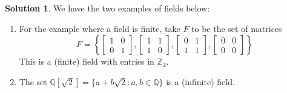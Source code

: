 \documentclass[11pt]{amsart}
\theoremstyle{}\newtheorem{question}{Question}
\theoremstyle{definition}\newtheorem*{solution}{Solution}
\newcommand{\Q}{\mathbb{Q}}
\newcommand{\Z}{\mathbb{Z}}
\begin{document}
\begin{solution}
    We have the two examples of fields below:
    \begin{enumerate}
        \item For the example where a field is finite, take $F$ to be the set of matrices
        \begin{equation*}
            F = \left\{\begin{bmatrix} 1 & 0 \\ 0 & 1 \end{bmatrix}, \begin{bmatrix} 1 & 1 \\ 1 & 0 \end{bmatrix}, \begin{bmatrix} 0 & 1 \\ 1 & 1 \end{bmatrix}, \begin{bmatrix} 0 & 0 \\ 0 & 0 \end{bmatrix}\right\}
        \end{equation*}
        This is a (finite) field with entries in $\Z_2$.

        \item The set $\Q[\sqrt{2}] = \{a + b\sqrt{2} : a, b \in \Q\}$ is a (infinite) field.
    \end{enumerate}
\end{solution}
\end{document}
